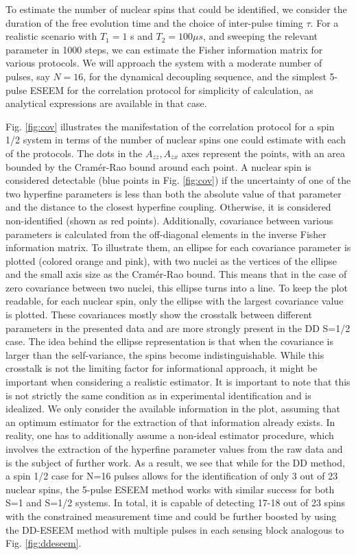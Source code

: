 \documentclass[%
 reprint,
superscriptaddress,
 amsmath,amssymb,
 aps,
]{revtex4-2}
\begin{document}
To estimate the number of nuclear spins that could be identified, we consider the duration of the free evolution time and the choice of inter-pulse timing $\tau$.
For a realistic scenario with $T_1 = 1$ s and $T_2 = 100 \mu s$, and sweeping the relevant parameter in 1000 steps, we can estimate the Fisher information matrix for various protocols.
We will approach the system with a moderate number of pulses, say $N=16$, for the dynamical decoupling sequence, and the simplest 5-pulse ESEEM for the correlation protocol for simplicity of calculation, as analytical expressions are available in that case.

Fig. \ref{fig:cov} illustrates the manifestation of the correlation protocol for a spin 1/2 system in terms of the number of nuclear spins one could estimate with each of the protocols.
The dots in the $A_{zz}, A_{zx}$ axes represent the points, with an area bounded by the Cramér-Rao bound around each point.
A nuclear spin is considered detectable (blue points in Fig. \ref{fig:cov}) if the uncertainty of one of the two hyperfine parameters is less than both the absolute value of that parameter and the distance to the closest hyperfine coupling.
Otherwise, it is considered non-identified (shown as red points). 
Additionally, covariance between various parameters is calculated from the off-diagonal elements in the inverse Fisher information matrix.
To illustrate them, an ellipse for each covariance parameter is plotted (colored orange and pink), with two nuclei as the vertices of the ellipse and the small axis size as the Cramér-Rao bound.
This means that in the case of zero covariance between two nuclei, this ellipse turns into a line.
To keep the plot readable, for each nuclear spin, only the ellipse with the largest covariance value is plotted.
These covariances mostly show the crosstalk between different parameters in the presented data and are more strongly present in the DD S=1/2 case. 
The idea behind the ellipse representation is that when the covariance is larger than the self-variance, the spins become indistinguishable.
While this crosstalk is not the limiting factor for informational approach, it might be important when considering a realistic estimator.
It is important to note that this is not strictly the same condition as in experimental identification and is idealized.
We only consider the available information in the plot, assuming that an optimum estimator for the extraction of that information already exists.
In reality, one has to additionally assume a non-ideal estimator procedure, which involves the extraction of the hyperfine parameter values from the raw data and is the subject of further work.
As a result, we see that while for the DD method, a spin 1/2 case for N=16 pulses allows for the identification of only 3 out of 23 nuclear spins, the 5-pulse ESEEM method works with similar success for both S=1 and S=1/2 systems. In total, it is capable of detecting 17-18 out of 23 spins with the constrained measurement time and could be further boosted by using the DD-ESEEM method with multiple pulses in each sensing block analogous to Fig. \ref{fig:ddeseem}.
\end{document}
